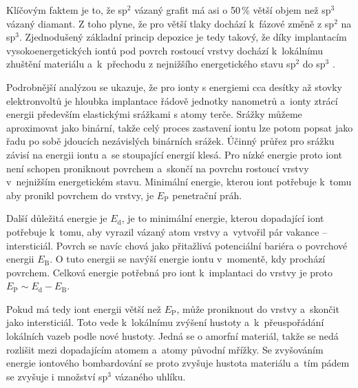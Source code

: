 Klíčovým faktem je to, že sp$^2$ vázaný grafit má asi o 50\,\% větší objem než sp$^3$ vázaný diamant. Z toho plyne, že pro větší tlaky dochází k~fázové změně z sp$^2$ na sp$^3$. Zjednodušený základní princip depozice je tedy takový, že díky implantacím vysokoenergetických iontů pod povrch rostoucí vrstvy dochází k~lokálnímu zhuštění materiálu a~k~přechodu z nej\-nižšího energetického stavu sp$^2$ do sp$^3$ \cite{McKenzie1991}.

Podrobnější analýzou se ukazuje, že pro ionty s energiemi cca desítky až stovky elektronvoltů je hloubka implantace  řádově jednotky nanometrů a~ionty ztrácí energii především elastickými srážkami s atomy terče. Srážky můžeme aproximovat jako binární, takže celý proces zastavení iontu lze potom popsat jako řadu po sobě jdoucích nezávislých binárních srážek. Účinný průřez pro srážku závisí na energii iontu a~se stoupající energií klesá. Pro nízké energie proto iont není schopen proniknout povrchem a~skončí na povrchu rostoucí vrstvy v~nejnižším energetickém stavu. Minimální energie, kterou iont potřebuje k~tomu aby pronikl povrchem do vrstvy, je $E_\mathrm{P}$ penetrační práh. 

Další důležitá energie je $E_\mathrm{d}$, je to minimální energie, kterou dopadající iont potřebuje k~tomu, aby vyrazil vázaný atom vrstvy a~vytvořil pár vakance -- intersticiál. Povrch se navíc chová jako přitažlivá potenciální bariéra o povrchové energii $E_\mathrm{B}$. O tuto energii se navýší energie iontu v~momentě, kdy prochází povrchem. Celková energie potřebná pro iont k~implantaci do vrstvy je proto $E_\mathrm{P} \sim E_\mathrm{d} - E_\mathrm{B}$. 

Pokud má tedy iont energii větší než $E_\mathrm{P}$, může proniknout do vrstvy a~skončit jako intersticiál. Toto vede k~lokálnímu zvýšení hustoty a~k~přeuspořádání lokálních vazeb podle nové hustoty. Jedná se o amorfní materiál, takže se nedá rozlišit mezi dopadajícím atomem a~atomy původní mřížky. Se zvyšováním energie iontového bombardování se proto zvyšuje hustota materiálu a~tím pádem se zvyšuje i množství sp$^3$ vázaného uhlíku.

